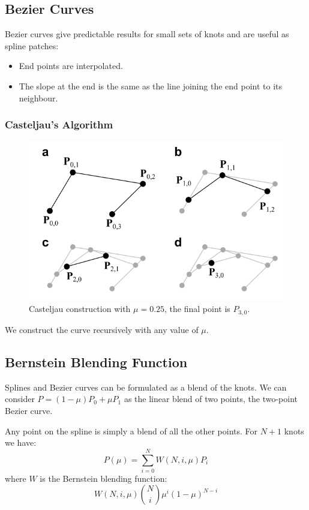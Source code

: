 \documentclass[11pt]{article}
\begin{document}
\subsection{Bezier Curves}
Bezier curves give predictable results for small sets of knots and are useful as spline patches:
\begin{itemize}
  \item End points are interpolated.
  \item The slope at the end is the same as the line joining the end point to its neighbour.
\end{itemize}

\subsubsection{Casteljau's Algorithm}
\begin{figure}[htb!]
  \centering
  \caption{Casteljau construction with $\mu = 0.25$, the final point is $P_{3,0}$.}
  \includegraphics[scale=0.5]{casteljau}
\end{figure}

We construct the curve recursively with any value of $\mu$.

\subsection{Bernstein Blending Function}
Splines and Bezier curves can be formulated as a blend of the knots.
We can consider $P = (1 - \mu)P_0 + \mu P_1$ as the linear blend of two points, the two-point Bezier curve.

Any point on the spline is simply a blend of all the other points.
For $N + 1$ knots we have:
\[
  P(\mu) = \sum_{i=0}^N W(N, i, \mu)P_i 
\]
where $W$ is the Bernstein blending function:
\[
  W(N, i, \mu) \binom{N}{i} \mu^i (1 - \mu)^{N - i}
\]
\end{document}
